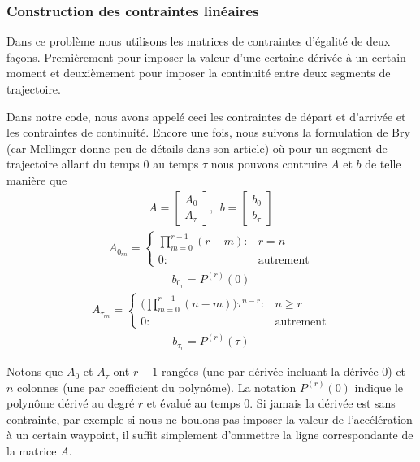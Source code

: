\subsubsection{Construction des contraintes linéaires}

Dans ce problème nous utilisons les matrices de contraintes d'égalité de deux façons. Premièrement pour imposer la valeur d'une certaine dérivée à un certain moment et deuxièmement pour imposer la continuité entre deux segments de trajectoire.

Dans notre code, nous avons appelé ceci les contraintes de départ et d'arrivée et les contraintes de continuité. Encore une fois, nous suivons la formulation de Bry \cite{bry2012control}(car Mellinger donne peu de détails dans son article) où pour un segment de trajectoire allant du temps $0$ au temps $\tau$ nous pouvons contruire $A$ et $b$ de telle manière que
\begin{align}
A = \begin{bmatrix} A_0 \\ A_\tau \end{bmatrix},\ \ b = \begin{bmatrix} b_0 \\ b_\tau \end{bmatrix}
\end{align}
\begin{align}
A_{0_{rn}} = \left\{
  \begin{array}{ll}
    \prod_{m = 0}^{r-1} (r-m): & r = n \\
    0 : & \text{autrement}
  \end{array}
\right.
\end{align}
\begin{align}
b_{0_r} = P^{(r)}(0)
\end{align}
\begin{align}
A_{\tau_{rn}} = \left\{
  \begin{array}{ll}
    \big(\prod_{m = 0}^{r-1} (n-m) \Big) \tau^{n-r} : & n \geq r \\
    0 : & \text{autrement}
  \end{array}
\right.
\end{align}
\begin{align}
b_{\tau_r} = P^{(r)}(\tau)
\end{align}

Notons que $A_0$ et $A_\tau$ ont $r+1$ rangées (une par dérivée incluant la dérivée 0) et $n$ colonnes (une par coefficient du polynôme). La notation $P^{(r)}(0)$ indique le polynôme dérivé au degré $r$ et évalué au temps $0$. Si jamais la dérivée est sans contrainte, par exemple si nous ne boulons pas imposer la valeur de l'accélération à un certain waypoint, il suffit simplement d'ommettre la ligne correspondante de la matrice $A$.

